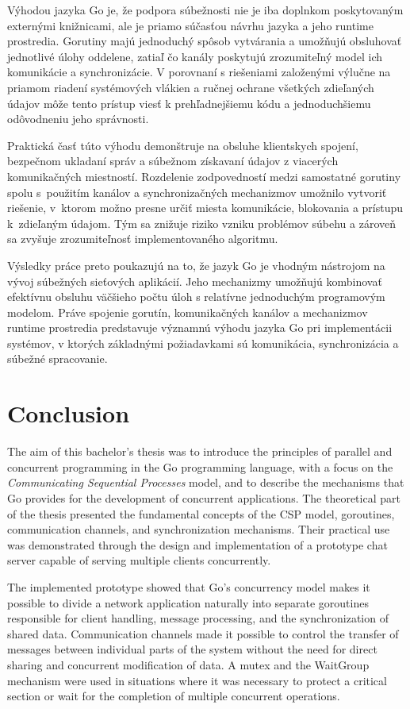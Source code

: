 \documentclass[
  biblatex,
  seconds=true,
  language=slovak,
  figures=false,
  urldate=iso,
  glossaries,
  index
]{kidiplom}
\begin{document}
Výhodou jazyka Go je, že podpora súbežnosti nie je iba doplnkom poskytovaným externými knižnicami, ale je priamo súčasťou návrhu jazyka a jeho runtime prostredia. Gorutiny majú jednoduchý spôsob vytvárania a umožňujú obsluhovať jednotlivé úlohy oddelene, zatiaľ čo kanály poskytujú zrozumiteľný model ich komunikácie a synchronizácie. V porovnaní s riešeniami založenými výlučne na priamom riadení systémových vlákien a ručnej ochrane všetkých zdieľaných údajov môže tento prístup viesť k prehľadnejšiemu kódu a jednoduchšiemu odôvodneniu jeho správnosti.

Praktická časť túto výhodu demonštruje na obsluhe klientskych spojení, bezpečnom ukladaní správ a súbežnom získavaní údajov z viacerých komunikačných miestností. Rozdelenie zodpovedností medzi samostatné gorutiny spolu s~použitím kanálov a synchronizačných mechanizmov umožnilo vytvoriť riešenie, v~ktorom možno presne určiť miesta komunikácie, blokovania a prístupu k~zdieľaným údajom. Tým sa znižuje riziko vzniku problémov súbehu a zároveň sa zvyšuje zrozumiteľnosť implementovaného algoritmu.

Výsledky práce preto poukazujú na to, že jazyk Go je vhodným nástrojom na vývoj súbežných sieťových aplikácií. Jeho mechanizmy umožňujú kombinovať efektívnu obsluhu väčšieho počtu úloh s relatívne jednoduchým programovým modelom. Práve spojenie gorutín, komunikačných kanálov a mechanizmov runtime prostredia predstavuje významnú výhodu jazyka Go pri implementácii systémov, v ktorých základnými požiadavkami sú komunikácia, synchronizácia a súbežné spracovanie.

\newpage
\section{Conclusion}
The aim of this bachelor's thesis was to introduce the principles of parallel and concurrent programming in the Go programming language, with a focus on the \textit{Communicating Sequential Processes} model, and to describe the mechanisms that Go provides for the development of concurrent applications. The theoretical part of the thesis presented the fundamental concepts of the CSP model, goroutines, communication channels, and synchronization mechanisms. Their practical use was demonstrated through the design and implementation of a prototype chat server capable of serving multiple clients concurrently.

The implemented prototype showed that Go's concurrency model makes it possible to divide a network application naturally into separate goroutines responsible for client handling, message processing, and the synchronization of shared data. Communication channels made it possible to control the transfer of messages between individual parts of the system without the need for direct sharing and concurrent modification of data. A mutex and the WaitGroup mechanism were used in situations where it was necessary to protect a critical section or wait for the completion of multiple concurrent operations.
\end{document}
